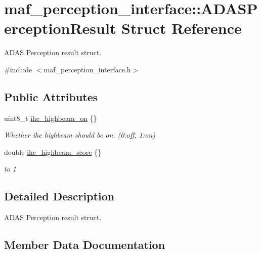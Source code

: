 \hypertarget{structmaf__perception__interface_1_1ADASPerceptionResult}{}\section{maf\+\_\+perception\+\_\+interface\+:\+:A\+D\+A\+S\+Perception\+Result Struct Reference}
\label{structmaf__perception__interface_1_1ADASPerceptionResult}


A\+D\+AS Perception result struct.  




{\ttfamily \#include $<$maf\+\_\+perception\+\_\+interface.\+h$>$}

\subsection*{Public Attributes}
\begin{DoxyCompactItemize}
\item 
uint8\+\_\+t \hyperlink{structmaf__perception__interface_1_1ADASPerceptionResult_a09aff0447bd659ad756e8b147bae4b4f}{ihc\+\_\+highbeam\+\_\+on} \{\}
\begin{DoxyCompactList}\small\item\em Whether ihc highbeam should be on. (0\+:off, 1\+:on) \end{DoxyCompactList}\item 
double \hyperlink{structmaf__perception__interface_1_1ADASPerceptionResult_a9a7c255ad020646a1855d4fca1ddf78c}{ihc\+\_\+highbeam\+\_\+score} \{\}
\begin{DoxyCompactList}\small\item\em to 1 \end{DoxyCompactList}\end{DoxyCompactItemize}


\subsection{Detailed Description}
A\+D\+AS Perception result struct. 

\subsection{Member Data Documentation}
\mbox{\label{structmaf__perception__interface_1_1ADASPerceptionResult_a09aff0447bd659ad756e8b147bae4b4f}} 
